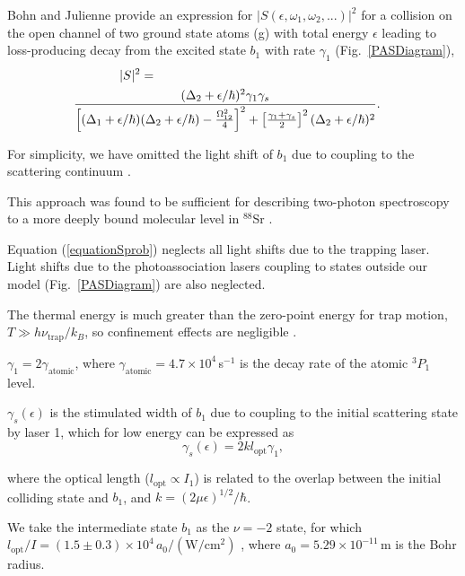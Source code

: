 Bohn and Julienne \cite{bju96} provide an expression for $\vert S(\epsilon,\omega_1,\omega_2,...)\vert^2$ for a collision on the open channel of two ground state atoms (g) with total energy $\epsilon$ leading to loss-producing decay from the excited state $b_1$ with rate $\gamma_1$ (Fig.\ \ref{PASDiagram}),
\begin{eqnarray}
  \vert S\vert^2 =   \hspace{2.5in}&&\\
  {(\Delta_2+\epsilon/\hbar)^2{\gamma}_1{\gamma}_s \over
  	\left[(\Delta_1+\epsilon/\hbar)(\Delta_2+\epsilon/\hbar)-\frac{\Omega_{12}^{2}}{4}\right]^2+\left[ \frac{\gamma_1+\gamma_s}{2}\right]^2(\Delta_2+		 	\epsilon/\hbar)^2}. &&\nonumber
\end{eqnarray}


For simplicity, we have omitted the light shift of $b_1$ due to coupling to the scattering continuum \cite{bju99}.

This approach was found to be sufficient for describing two-photon spectroscopy to a more deeply bound molecular level in $^{88}$Sr \cite{mmp08}.

Equation (\ref{equationSprob}) neglects all light shifts due to the trapping laser. Light shifts due to the photoassociation lasers coupling to states outside our model (Fig.\ \ref{PASDiagram}) are also neglected.

The thermal energy is much greater than the zero-point energy for trap motion, $T\gg h\nu_{\text{trap}}/k_B$, so confinement effects are negligible \cite{zbl06}.

${\gamma}_{1}=2\gamma_{\text{atomic}}$, where $\gamma_{\text{atomic}}=4.7\times 10^4$\,s$^{-1}$ is the decay rate of the atomic $^3P_1$ level.

${\gamma}_{s}(\epsilon)$ is the stimulated width of $b_1$ due to coupling to the initial scattering state by laser 1, which for low energy can be expressed as \cite{ctj06,bmc14,Pachomow2017a}
\begin{equation}\label{equationstimulatedwidth}
	{\gamma}_{s}(\epsilon)=2k l_{\text{opt}} \gamma_1,
\end{equation}

where the optical length ($l_{\text{opt}}\propto I_1$) is related to the overlap between the initial colliding state and $b_1$, and $k=(2\mu \epsilon)^{1/2}/\hbar$.

We take the intermediate state $b_1$ as the $\nu=-2$ state, for which $l_{\text{opt}}/I=(1.5\pm0.3)\times 10^4\,a_0\mathrm{/(W/cm^2)}$ \cite{bmc14}, where $a_0=5.29\times 10^{-11}$\,m is the Bohr radius.

